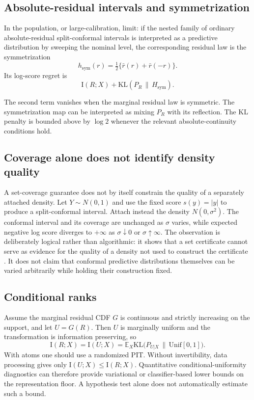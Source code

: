 \documentclass[11pt]{article}
\theoremstyle{remark}
\newcommand{\E}{\mathbb{E}}
\newcommand{\KL}{\mathrm{KL}}
\newcommand{\I}{\mathrm{I}}
\begin{document}
\subsection{Absolute-residual intervals and symmetrization}\label{sec:abs}

In the population, or large-calibration, limit: if the nested family of ordinary
absolute-residual split-conformal intervals is interpreted as a predictive distribution by
sweeping the nominal level, the corresponding residual law is the symmetrization
\[
h_{\mathrm{sym}}(r)=\tfrac12\big\{\bar r(r)+\bar r(-r)\big\}.
\]
Its log-score regret is
\[
\I(R;X)+\KL(P_R\,\|\,H_{\mathrm{sym}}).
\]

The second term vanishes when the marginal residual law is symmetric. The symmetrization map can be interpreted as mixing $P_R$ with its reflection. The KL
penalty is bounded above by $\log 2$ whenever the relevant absolute-continuity conditions
hold.

\subsection{Coverage alone does not identify density quality}\label{sec:coverage}

A set-coverage guarantee does not by itself constrain the quality of a separately attached
density. Let $Y\sim N(0,1)$ and use the fixed score $s(y)=|y|$ to produce a split-conformal
interval. Attach instead the density $N(0,\sigma^2)$. The conformal interval and its coverage
are unchanged as $\sigma$ varies, while expected negative log score diverges to $+\infty$ as
$\sigma\downarrow0$ or $\sigma\uparrow\infty$. The observation is deliberately logical rather
than algorithmic: it shows that a set certificate cannot serve as evidence for the quality of a
density not used to construct the certificate \citep{recht2024cover}. It does not claim that
conformal predictive distributions themselves can be varied arbitrarily while holding their
construction fixed.

\subsection{Conditional ranks}\label{sec:ranks}

Assume the marginal residual CDF $G$ is continuous and strictly increasing on the support, and
let $U=G(R)$. Then $U$ is marginally uniform and the transformation is information preserving, so
\[
\I(R;X)=\I(U;X)=\E_X\KL\big(P_{U|X}\,\|\,\mathrm{Unif}[0,1]\big).
\]
With atoms one should use a randomized PIT. Without invertibility, data processing gives only
$\I(U;X)\le\I(R;X)$. Quantitative conditional-uniformity diagnostics can therefore provide variational or
classifier-based lower bounds on the representation floor. A hypothesis test alone does not
automatically estimate such a bound.
\end{document}
